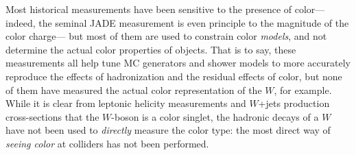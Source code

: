 

Most historical measurements have been sensitive to the presence of color--- indeed, the seminal JADE measurement is even principle to the magnitude of the color charge--- but most of them are used to constrain color \textit{models}, and not determine the actual color properties of objects. That is to say, these measurements all help tune MC generators and shower models to more accurately reproduce the effects of hadronization and the residual effects of color, but none of them have measured the actual color representation of the $W$, for example. While it is clear from leptonic helicity measurements and $W$+jets production cross-sections that the $W$-boson is a color singlet, the hadronic decays of a $W$ have not been used to \textit{directly} measure the color type: the most direct way of \textit{seeing color} at colliders has not been performed.

